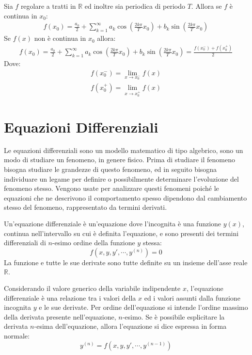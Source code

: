 \documentclass{article}
\numberwithin{equation}{subsection}
\begin{document}
Sia $f$ regolare a tratti in $\mathbb{R}$ ed inoltre sia periodica di periodo $T$. Allora se $f$ è continua in $x_0$:
\begin{gather}
    f(x_0)=\displaystyle\frac{a_0}{2}+\sum_{k=1}^\infty a_k\cos\left(\frac{2k\pi}{T}x_0\right)+b_k\sin\left(\frac{2k\pi}{T}x_0\right)
\end{gather}
Se $f(x)$ non è continua in $x_0$ allora:
\begin{gather}
    f(x_0)=\displaystyle\frac{a_0}{2}+\sum_{k=1}^\infty a_k\cos\left(\frac{2k\pi}{T}x_0\right)+b_k\sin\left(\frac{2k\pi}{T}x_0\right)=\frac{f(x_0^-)+f(x_0^+)}{2}
\end{gather}
Dove:
\begin{gather*}
    f(x_0^-)=\lim_{x\to x_0^-}f(x)\\
    f(x_0^+)=\lim_{x\to x_0^+}f(x)
\end{gather*}

\clearpage

\section{Equazioni Differenziali}

Le equazioni differenziali sono un modello matematico di tipo algebrico, sono un modo di studiare un fenomeno, in genere fisico. Prima di studiare il fenomeno bisogna studiare le grandezze di questo fenomeno, ed in seguito bisogna individuare un legame per definire o possibilmente determinare l'evoluzione del fenomeno stesso. 
Vengono usate per analizzare questi fenomeni poiché le equazioni che ne descrivono il comportamento spesso dipendono dal cambiamento stesso del fenomeno, rappresentato da termini derivati. 

Un'equazione differenziale è un'equazione dove l'incognita è una funzione $y(x)$, continua nell'intervallo su cui è definita l'equazione, e sono presenti dei termini differenziali di $n$-esimo ordine della funzione $y$ stessa:
\begin{equation}
    f(x, y, y', \cdots, y^{(n)})=0
\end{equation}
La funzione e tutte le sue derivate sono tutte definite su un insieme dell'asse reale $\mathbb{R}$. 

Considerando il valore generico della variabile indipendente $x$, l'equazione differenziale è una relazione tra i valori della $x$ ed i valori assunti dalla funzione incognita $y$ e le sue derivate. 
Per ordine dell'equazione si intende l'ordine massimo della derivata presente nell'equazione, $n$-esimo. Se è possibile esplicitare la derivata $n$-esima dell'equazione, allora l'equazione si dice espressa in forma normale:
\begin{equation}
    y^{(n)}=f(x, y, y', \cdots, y^{(n-1)})
\end{equation}
\end{document}
